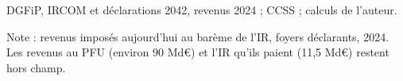 DGFiP, IRCOM et déclarations 2042, revenus 2024 ; CCSS ; calculs de l'auteur.\par Note : revenus imposés aujourd'hui au barème de l'IR, foyers déclarants, 2024. Les revenus au PFU (environ 90 Md\euro{}) et l'IR qu'ils paient (11,5 Md\euro{}) restent hors champ.
